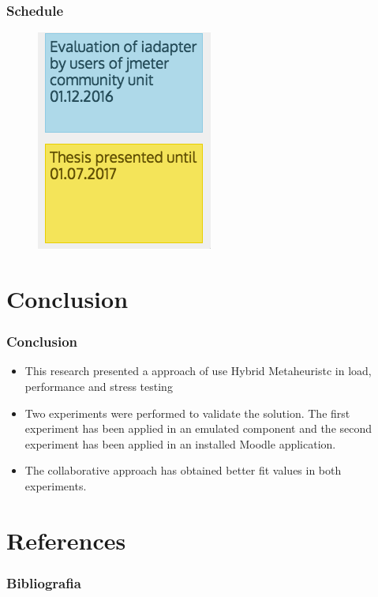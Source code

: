 \documentclass{beamer}
\begin{document}
\begin{frame}
\frametitle{Schedule}
\begin{figure}[H]
\centering
\includegraphics[width=0.5\linewidth]{stories2.PNG}
\end{figure}
\end{frame}




\section{Conclusion}

\begin{frame}
\frametitle{Conclusion}

\begin{itemize}
\item This research presented a approach of use Hybrid Metaheuristc in load, performance and stress testing
\item Two experiments were performed to validate the solution. The first experiment has been applied in an emulated component and the second experiment has been applied in an installed Moodle application.
\item The collaborative approach has obtained better fit values in both experiments.
\end{itemize}
\end{frame}


\section{References}

\begin{frame}[allowframebreaks]
\frametitle{Bibliografia}



\end{frame}
\end{document}
